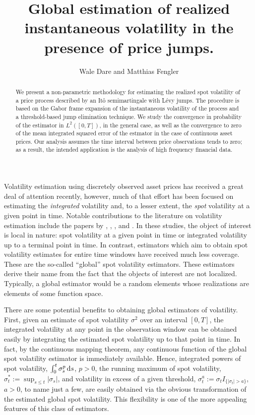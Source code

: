 \documentclass[a4paper, 12pt]{article}
\author{Wale Dare and Matthias Fengler}
\title {Global estimation of realized instantaneous volatility in the presence of \levy price jumps.}
\newcommand{\ito}{It\^o\xspace}
\renewcommand{\D}{\ensuremath{\dif}\xspace}
\newcommand{\levy}{L\'evy\xspace}
\begin{document}
\maketitle
\begin{abstract}
  We present a non-parametric methodology for estimating the realized spot volatility of a price process described by  an \ito semimartingale with \levy jumps. The procedure is based on the Gabor frame expansion of the   instantaneous volatility of the process and  a threshold-based jump elimination technique. We study the convergence in probability of the estimator in $L^2([0,T])$, in the general case,  as well as the convergence to zero of the mean integrated  squared error of the estmator  in the case of continuous asset prices. Our analysis assumes  the time interval between price observations tends to zero; as a result, the intended application is the analysis of high frequency financial data.    

\end{abstract}
Volatility estimation using discretely observed asset prices has received a great deal of attention recently, however,  much of that effort has been focused on 
estimating the \emph{integrated} volatility and, to a lesser extent, the \emph{spot} volatility at a given point in time. 
Notable contributions to the literature on volatility estimation include the papers by \cite{Foster1996}, \cite{Fan2008},   \cite{Florens1993}, and  \cite{BN2004}.
In these studies, the object of interest is local in nature: spot volatility at a given point in time or integrated volatility up to a terminal point in time. In contrast,  estimators which aim  to obtain {spot} volatility estimates  for  entire time windows  have received much less coverage. These are the so-called ``global'' spot volatility estimators. These estimators derive their name from   the fact that the objects of interest are not localized. Typically, a global estimator would be a    random elements whose realizations are  elements of some function space.     

There are some potential benefits to obtaining global estimators of volatility. First, given an estimate of spot volatility $\sigma^2$ over an interval $[0,T]$, the  integrated volatility at any point in the observation window can be obtained easily  by integrating the estimated spot volatility up to that point in time.  In fact, by the continuous mapping theorem, any continuous function of the global spot volatility estimator is immediately available. Hence, integrated powers of spot volatility, $\int^t_0\sigma^p_s \D s$, $p > 0$,  the running maximum of spot volatility, $\sigma^*_t := \sup_{s \le t} \vert \sigma_s \vert$, and volatility in  excess of a given threshold, $\sigma^a_t:=  \sigma_t  I_{\{\vert \sigma_t \vert > a\}}$, $a > 0$,  to name just a few, are easily obtained via  the obvious  transformation of the estimated  global spot volatility.   This flexibility is one of the more appealing features  of this class of estimators.
\end{document}
